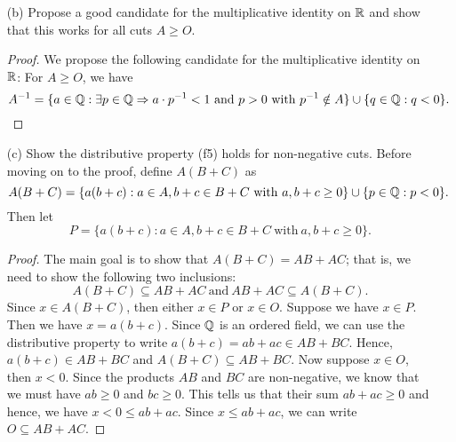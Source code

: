 \begin{enumerate}
\begin{proof}
    Now we need to show that  property \( (o5)   \) holds for \( AB \). Assume \( A \geq O  \) and \( B \geq O  \). We know that \( O \subseteq A   \) and \(  O \subseteq B  \). This means that if we let \(  p, w \in O  \), then \( p, w \in A  \) and \( p, w  \in B  \). Note that \( p \cdot w < 0   \). Since \( ab \geq 0  \), we know that \( pw \leq ab  \) which implies that \( pw \in AB \) and hence, \( O \subseteq AB \).
        \end{proof}
    \item[(b)] Propose a good candidate for the multiplicative identity on \( \mathbb{R}  \) and show that this works for all cuts \( A \geq O  \).
        \begin{proof}
        We propose the following candidate for the multiplicative identity on \( \mathbb{R}  \): For \( A \geq O  \), we have 
        \[  A^{-1} =  \{ a \in \Q : \exists p \in \Q \implies a \cdot p^{-1} < 1 \ \text{and } p > 0 \ \text{with} \ p^{-1} \notin A   \} \cup \{ q \in \Q : q < 0  \}. \] 
        \end{proof}

    \item[(c)] Show the distributive property (f5) holds for non-negative cuts.
        Before moving on to the proof, define \( A(B+C)  \) as 
        \[  A(B+C) = \{ a(b+c) : a \in A, b+c \in B+C \ \text{with} \ a, b+c \geq 0   \} \cup  \{ p \in \mathbb{Q} : p < 0  \}. \] Then let 
        \[  P = \{ a(b+c) : a \in A , b+c \in B + C \ \text{with} \ a, b+c \geq 0   \}.  \]
        \begin{proof}
        The main goal is to show that \( A (B+C) = AB + AC \); that is, we need to show the following two inclusions:
        \[  A (B+C) \subseteq AB+AC  \ \text{and} \  AB+AC \subseteq  A (B+C). \]
        Since \( x \in A(B+C)  \), then either \( x \in  P  \) or \( x \in O  \). Suppose we have \( x \in P  \). Then we have \( x = a(b+c)  \). Since \( \mathbb{Q}  \) is an ordered field, we can use the distributive property to write \( a(b+c) = ab+ ac \in AB + BC   \). Hence, \( a(b+c) \in AB + BC  \) and \( A(B+C) \subseteq AB + BC  \). Now suppose \( x \in O  \), then \( x < 0  \). Since the products \( AB  \) and \( BC  \) are non-negative, we know that we must have \( ab \geq 0  \) and \( bc \geq 0  \). This tells us that their sum \( ab + ac \geq 0  \) and hence, we have \( x <  0 \leq ab + ac   \). Since \( x \leq ab + ac  \), we can write \( O \subseteq AB + AC  \).  


\end{proof}
\end{enumerate}
